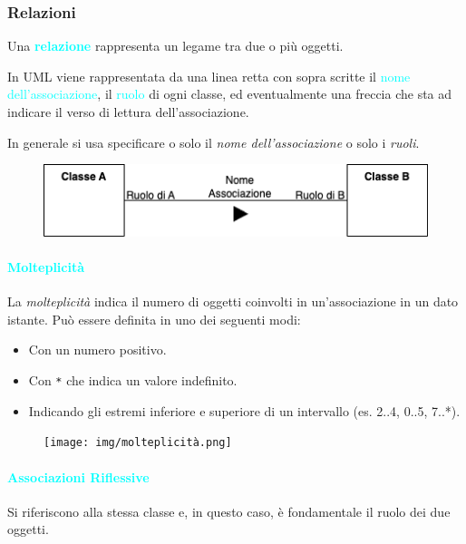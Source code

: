 \subsubsection{Relazioni}

\begin{definition}[Relazione]
    Una \textbf{\textcolor{cyan}{relazione}} rappresenta un legame tra due o più oggetti.

    In UML viene rappresentata da una linea retta con sopra scritte il \textcolor{cyan}{nome dell'associazione}, il \textcolor{cyan}{ruolo} di ogni classe, ed
    eventualmente una freccia che sta ad indicare il verso di lettura dell'associazione.

    In generale si usa specificare o solo il \emph{nome dell'associazione} o solo i \emph{ruoli}.
\end{definition}

\begin{figure}[h]
    \centering
    \includegraphics[scale=0.7]{img/relazione.png}
\end{figure}

\newpage
\paragraph{\textcolor{cyan}{Molteplicità}} La \emph{molteplicità} indica il numero di oggetti
coinvolti in un'associazione in un dato istante. Può essere definita in uno dei seguenti modi:
\begin{itemize}
    \item Con un numero positivo.
    \item Con \verb|*| che indica un valore indefinito.
    \item Indicando gli estremi inferiore e superiore di un intervallo (es. 2..4, 0..5, 7..*).
\end{itemize}

\begin{figure}[h]
    \centering
    \texttt{[image: img/molteplicità.png]}
\end{figure}

\paragraph{\textcolor{cyan}{Associazioni Riflessive}} Si riferiscono alla stessa classe e, in questo caso, è fondamentale il ruolo
dei due oggetti.

